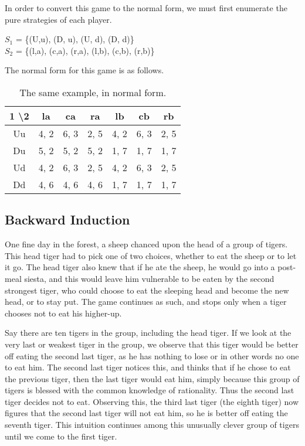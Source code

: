 \documentclass[11pt]{article}
\theoremstyle{definition}
\begin{document}
In order to convert this game to the normal form, we must first enumerate the pure strategies of each player.

\begin{center}
$S_1$ = \{(U,u), (D, u), (U, d), (D, d)\} \\
$S_2$ = \{(l,a), (c,a), (r,a), (l,b), (c,b), (r,b)\}
\end{center}

The normal form for this game is as follows.

\begin{table}[h!]
\centering
\begin{tabular}{|c|c|c|c|c|c|c|}
\hline
1 \textbackslash 2 & la & ca & ra & lb & cb & rb \\
\hline
Uu & 4, 2 & 6, 3 & 2, 5 & 4, 2 & 6, 3 & 2, 5 \\
\hline
Du & 5, 2 & 5, 2 & 5, 2 & 1, 7 & 1, 7 & 1, 7 \\
\hline
Ud & 4, 2 & 6, 3 & 2, 5 & 4, 2 & 6, 3 & 2, 5 \\
\hline
Dd & 4, 6 & 4, 6 & 4, 6 & 1, 7 & 1, 7 & 1, 7 \\
\hline
\end{tabular}
\caption{The same example, in normal form.}
\label{table:nrexex}
\end{table}

\subsection{Backward Induction}

One fine day in the forest, a sheep chanced upon the head of a group of tigers. This head tiger had to pick one of two choices, whether to eat the sheep or to let it go. The head tiger also knew that if he ate the sheep, he would go into a post-meal siesta, and this would leave him vulnerable to be eaten by the second strongest tiger, who could choose to eat the sleeping head and become the new head, or to stay put. The game continues as such, and stops only when a tiger chooses not to eat his higher-up.

Say there are ten tigers in the group, including the head tiger. If we look at the very last or weakest tiger in the group, we observe that this tiger would be better off eating the second last tiger, as he has nothing to lose or in other words no one to eat him. The second last tiger notices this, and thinks that if he chose to eat the previous tiger, then the last tiger would eat him, simply because this group of tigers is blessed with the common knowledge of rationality. Thus the second last tiger decides not to eat. Observing this, the third last tiger (the eighth tiger) now figures that the second last tiger will not eat him, so he is better off eating the seventh tiger. This intuition continues among this unusually clever group of tigers until we come to the first tiger. 
\end{document}
